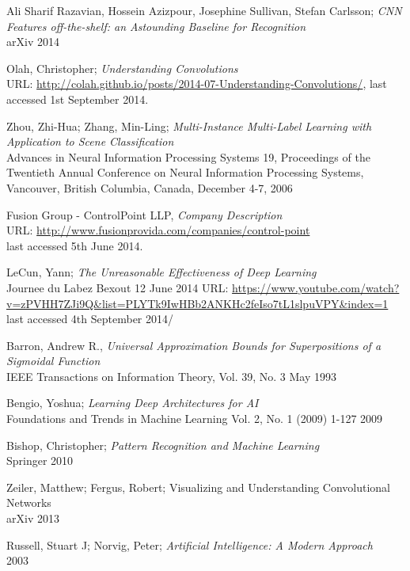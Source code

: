 \documentclass[a4paper,11pt]{article}
\begin{document}
\begin{thebibliography}{1}
 Ali Sharif Razavian, Hossein Azizpour, Josephine Sullivan, Stefan Carlsson;
 \emph{CNN Features off-the-shelf: an Astounding Baseline for Recognition}\\
 arXiv 2014
 
 Olah, Christopher;
 \emph{Understanding Convolutions}\\
 URL: \url{http://colah.github.io/posts/2014-07-Understanding-Convolutions/}, last accessed 1st September 2014.

 Zhou, Zhi-Hua; Zhang, Min-Ling;
  \emph{Multi-Instance Multi-Label Learning with Application to Scene Classification}\\
  Advances in Neural Information Processing Systems 19, 
  Proceedings of the Twentieth Annual Conference on Neural Information Processing Systems, 
  Vancouver, British Columbia, Canada, 
  December 4-7, 2006

 Fusion Group - ControlPoint LLP,
 \emph{Company Description}\\
 URL: \url{http://www.fusionprovida.com/companies/control-point}\\ last accessed 5th June 2014. 
  
 LeCun, Yann;
 \emph{The Unreasonable Effectiveness of Deep Learning}\\
 Journee du Labez Bexout
 12 June 2014  
 URL: \url{https://www.youtube.com/watch?v=zPVHH7ZJi9Q&list=PLYTk9IwHBb2ANKHc2feIso7tL1slpuVPY&index=1}\\ last accessed 4th September 2014/
  
 Barron, Andrew R.,
 \emph{Universal Approximation Bounds for Superpositions of a Sigmoidal Function}\\
 IEEE Transactions on Information Theory, 
 Vol. 39, No. 3
 May 1993

 Bengio, Yoshua;
 \emph{Learning Deep Architectures for AI}\\
 Foundations and Trends in Machine Learning 
 Vol. 2, No. 1 (2009) 1-127
 2009

 Bishop, Christopher;
 \emph{Pattern Recognition and Machine Learning}\\
 Springer 2010

 Zeiler, Matthew; Fergus, Robert;
 Visualizing and Understanding Convolutional Networks\\
 arXiv 2013


 Russell, Stuart J; Norvig, Peter;
 \emph{Artificial Intelligence: A Modern Approach}\\
 2003


\end{thebibliography}
\end{document}
